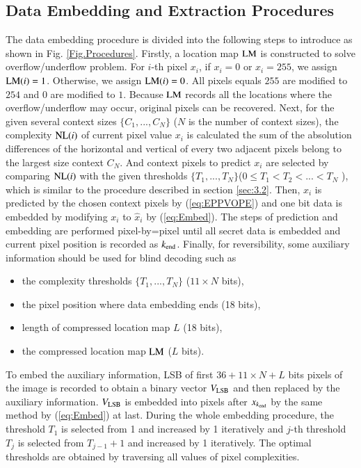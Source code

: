 \documentclass[review,3p,10pt,sort&compress]{elsarticle}
\begin{document}
\subsection{Data Embedding and Extraction Procedures}\label{sec:3.3}
The data embedding procedure is divided into the following steps to introduce as shown in Fig. \ref{Fig.Procedures}. Firstly, a location map ${\rm LM}$ is constructed to solve overflow/underflow problem. For $i$-th pixel $x_i$, if $x_i = 0$ or $x_i = 255$, we assign ${\rm LM}(i) = 1$. Otherwise, we assign ${\rm LM}(i) = 0$. All pixels equals $255$ are modified to $254$ and $0$ are modified to $1$. Because ${\rm LM}$ records all the locations where the overflow/underflow may occur, original pixels can be recovered. Next, for the given several context sizes $\{C_1, ..., C_N\}$ ($N$ is the number of context sizes), the complexity ${\rm NL}(i)$ of current pixel value $x_i$ is calculated the sum of the absolution differences of the horizontal and vertical of every two adjacent pixels belong to the largest size context $C_N$. And context pixels to predict $x_i$ are selected by comparing ${\rm NL}(i)$ with the given thresholds $\{T_1, ..., T_N\}$($0 \leq T_1 < T_2 < ... < T_N$ ), which is similar to the procedure described in section \ref{sec:3.2}. Then, $x_i$ is predicted by the chosen context pixels by (\ref{eq:EPPVOPE}) and one bit data is embedded by modifying $x_i$ to $\hat{x}_i$ by (\ref{eq:Embed}). The steps of prediction and embedding are performed pixel-by=pixel until all secret data is embedded and current pixel position is recorded as $k_{\rm end}$. Finally, for reversibility, some auxiliary information should be used for blind decoding such as
\begin{itemize}
  \item the complexity thresholds $\{T_1, ..., T_N\}$ ($11 \times N$ bits),
  \item the pixel position where data embedding ends (18 bits),
  \item length of compressed location map $L$ (18 bits),
  \item the compressed location map ${\rm LM}$ ($L$ bits).
\end{itemize}
To embed the auxiliary information, LSB of first $36 + 11 \times N + L$ bits pixels of the image is recorded to obtain a binary vector $V_{\rm LSB}$ and then replaced by the auxiliary information. $V_{\rm LSB}$ is embedded into pixels after $x_{k_{\rm end}}$ by the same method by (\ref{eq:Embed}) at last.
During the whole embedding procedure, the threshold $T_1$ is selected from 1 and increased by 1 iteratively and $j$-th threshold $T_j$ is selected from $T_{j-1} + 1$ and increased by 1 iteratively. The optimal thresholds are obtained by traversing all values of pixel complexities.
\end{document}
